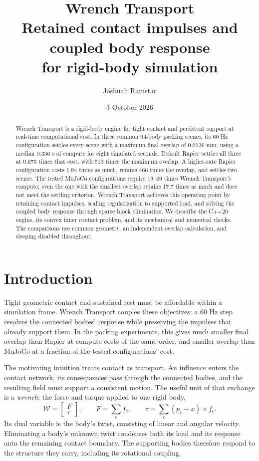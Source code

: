 \documentclass[10pt,letterpaper]{article}
\title{\vspace{-1.5em}\textcolor{ink}{Wrench Transport}\\[0.3em]\large Retained contact impulses and coupled body response\\for rigid-body simulation}
\author{Joshuah Rainstar}
\date{3 October 2026}
\begin{document}
\maketitle\thispagestyle{fancy}
\begin{abstract}
Wrench Transport is a rigid-body engine for tight contact and persistent support at real-time computational cost. In three common 64-body packing scenes, its 60 Hz configuration settles every scene with a maximum final overlap of 0.0136 mm, using a median 0.336 s of compute for eight simulated seconds. Default Rapier settles all three at 0.675 times that cost, with 513 times the maximum overlap. A higher-rate Rapier configuration costs 1.94 times as much, retains 466 times the overlap, and settles two scenes. The tested MuJoCo configurations require 19--49 times Wrench Transport's compute; even the one with the smallest overlap retains 17.7 times as much and does not meet the settling criterion. Wrench Transport achieves this operating point by retaining contact impulses, scaling regularization to supported load, and solving the coupled body response through sparse block elimination. We describe the C++20 engine, its convex inner contact problem, and its mechanical and numerical checks. The comparisons use common geometry, an independent overlap calculation, and sleeping disabled throughout.
\end{abstract}

\section{Introduction}
Tight geometric contact and sustained rest must be affordable within a simulation frame. Wrench Transport couples these objectives: a 60 Hz step resolves the connected bodies' response while preserving the impulses that already support them. In the packing experiments, this gives much smaller final overlap than Rapier at compute costs of the same order, and smaller overlap than MuJoCo at a fraction of the tested configurations' cost.

The motivating intuition treats contact as transport. An influence enters the contact network, its consequences pass through the connected bodies, and the resulting field must support a consistent motion. The useful unit of that exchange is a \emph{wrench}: the force and torque applied to one rigid body,
\begin{equation}
  \mathcal W = \begin{bmatrix}F\\\tau\end{bmatrix},\qquad
  F=\sum_c f_c,\qquad \tau=\sum_c (p_c-x)\times f_c.
\end{equation}
Its dual variable is the body's twist, consisting of linear and angular velocity. Eliminating a body's unknown twist condenses both its load and its response onto the remaining contact boundary. The supporting bodies therefore respond to the structure they carry, including its rotational coupling.
\end{document}
